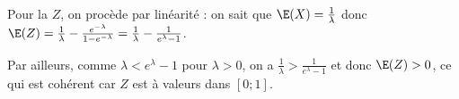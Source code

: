 {\begin{enumerate}
{		Pour la \va $Z$, on procède par linéarité : 
		on sait que $\E(X)=\frac{1}{\lambda}$ donc $\E(Z) = \frac{1}{\lambda}  -  \frac{e^{-\lambda}}{1-e^{-\lambda}} = \frac{1}{\lambda}  -  \frac{1}{e^{\lambda}-1}$. 
		
		Par ailleurs, comme $\lambda<e^\lambda-1$ pour $\lambda >0$, on a $\frac{1}{\lambda}>\frac{1}{e^\lambda -1}$ et donc $\E(Z)>0$, ce qui est cohérent car $Z$ est à valeurs dans $[0;1]$.}
\end{enumerate}}
